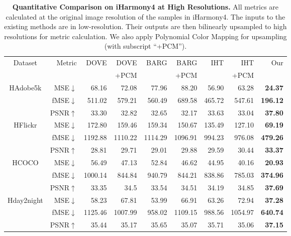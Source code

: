 \documentclass[runningheads]{llncs}
\begin{document}
\begin{table*}[ht]
  \begin{center}
    \caption{\textbf{Quantitative Comparison on iHarmony4 at High Resolutions.} All metrics are calculated at the original image resolution of the samples in iHarmony4. 
    The inputs to the existing methods are in low-resolution. Their outputs are then bilinearly upsampled to high resolutions for metric calculation. 
    We also apply Polynomial Color Mapping for upsampling (with subscript ``+PCM'').
}\label{tab:highresolution}
\setlength{\tabcolsep}{3pt}
\scriptsize
\begin{tabular}{c|r|rrrrrr|r}
\toprule
Dataset & Metric & DOVE\cite{DoveNet} & DOVE\cite{DoveNet} & BARG\cite{BargainNet} & BARG\cite{BargainNet} & IHT\cite{TransformerIH} & IHT\cite{TransformerIH} & \;\;\;\;\;\;\;\;Our \\
& & & +PCM & & +PCM & & +PCM & \\
\midrule
\multirow{3}{*}{HAdobe5k}
& MSE$\downarrow$  &  68.16 &  72.08 &  77.96 &  88.20 &  56.90 &  63.28 &  \textbf{24.37} \\
& fMSE$\downarrow$ & 511.02 & 579.21 & 560.49 & 689.58 & 465.72 & 547.61 & \textbf{196.12} \\
& PSNR$\uparrow$   &  33.30 &  32.82 &  32.65 &  32.17 &  33.63 &  33.04 &  \textbf{37.80} \\
\midrule
\multirow{3}{*}{HFlickr}
& MSE$\downarrow$  & 172.80 & 159.46 & 159.34 & 150.67 & 135.49 & 127.10 &  \textbf{69.19} \\
& fMSE$\downarrow$ &1192.88 &1110.22 &1114.29 &1096.91 & 994.23 & 976.08 & \textbf{479.26} \\
& PSNR$\uparrow$   &  28.81 &  29.71 &  29.01 &  29.88 &  29.59 &  30.44 &  \textbf{33.37} \\
\midrule
\multirow{3}{*}{HCOCO}
& MSE$\downarrow$  &  56.49 &  47.13 &  52.84 &  46.62 &  44.95 &  40.16 &  \textbf{20.93} \\
& fMSE$\downarrow$ &1000.14 & 844.84 & 940.79 & 844.21 & 838.86 & 785.03 & \textbf{374.96} \\
& PSNR$\uparrow$   &  33.35 &  34.5 &  33.54 &   34.51 &  34.19 &  34.85 &  \textbf{37.69} \\
\midrule
\multirow{3}{*}{Hday2night}
& MSE$\downarrow$  &  58.23 &  67.81 &  53.99 &  66.91 &  63.26 &  72.94 &  \textbf{37.28} \\
& fMSE$\downarrow$ &1125.46 &1007.99 & 958.02 &1109.15 & 988.56 &1054.97 & \textbf{640.74} \\
& PSNR$\uparrow$   &  35.44 &  35.17 &  35.65 &  35.07 &  35.71 &  35.06 &  \textbf{37.15} \\

\end{tabular}
\end{center}
\end{table*}
\end{document}
